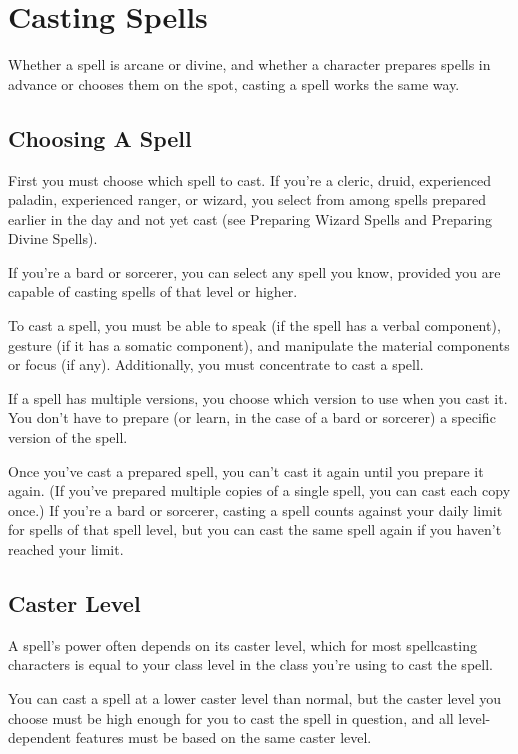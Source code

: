 \section{Casting Spells}
Whether a spell is arcane or divine, and whether a character prepares spells in advance or chooses them on the spot, casting a spell works the same way.

\subsection{Choosing A Spell}
First you must choose which spell to cast. If you're a cleric, druid, experienced paladin, experienced ranger, or wizard, you select from among spells prepared earlier in the day and not yet cast (see Preparing Wizard Spells and Preparing Divine Spells).

If you're a bard or sorcerer, you can select any spell you know, provided you are capable of casting spells of that level or higher.

To cast a spell, you must be able to speak (if the spell has a verbal component), gesture (if it has a somatic component), and manipulate the material components or focus (if any). Additionally, you must concentrate to cast a spell.

If a spell has multiple versions, you choose which version to use when you cast it. You don't have to prepare (or learn, in the case of a bard or sorcerer) a specific version of the spell.

Once you've cast a prepared spell, you can't cast it again until you prepare it again. (If you've prepared multiple copies of a single spell, you can cast each copy once.) If you're a bard or sorcerer, casting a spell counts against your daily limit for spells of that spell level, but you can cast the same spell again if you haven't reached your limit.




\subsection{Caster Level}
A spell's power often depends on its caster level, which for most spellcasting characters is equal to your class level in the class you're using to cast the spell.

You can cast a spell at a lower caster level than normal, but the caster level you choose must be high enough for you to cast the spell in question, and all level-dependent features must be based on the same caster level.

